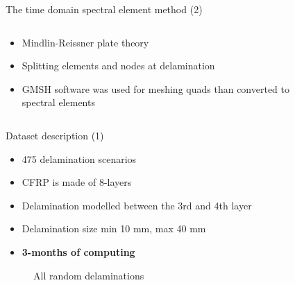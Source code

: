\documentclass[10pt,aspectratio=169,dvipsnames]{beamer} %
\begin{document}
\begin{frame}{The time domain spectral element method (2)}
	\begin{columns}[T]
		\begin{column}{0.47\textwidth}
			\begin{itemize}
				\item Mindlin-Reissner plate theory
				\item Splitting elements and nodes at delamination
				\item GMSH software was used for meshing quads than converted to spectral elements
			\end{itemize}	
			\begin{figure}
			\end{figure}
		\end{column}
		\begin{column}{0.47\textwidth}	
			\begin{figure}
			\end{figure}	
		\end{column}
	\end{columns}	
\end{frame}
\begin{frame}{Dataset description (1)}
	\begin{minipage}[l]{0.5\textwidth}
		\begin{itemize}
			\item 475 delamination scenarios
			\item CFRP is made of 8-layers
			\item Delamination modelled between the 3rd and 4th layer
			\item Delamination size min 10 mm, max  40 mm
			\item \textbf{3-months of computing}
		\end{itemize}
	\end{minipage}
	\begin{minipage}[c]{0.45\textwidth}
		\begin{figure}
			\centering
			\caption{All random delaminations}
		\end{figure}
	\end{minipage}
\end{frame}
\end{document}
